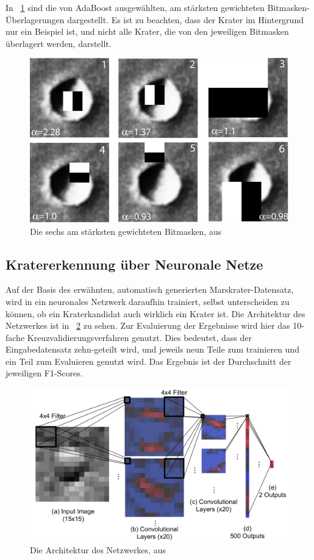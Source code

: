 In \figurename~\ref{fig:BDS12_02} sind die von AdaBoost ausgewählten, am stärksten gewichteten Bitmasken-Überlagerungen dargestellt. Es ist zu beachten, dass der Krater im Hintergrund nur ein Beispiel ist, und nicht alle Krater, die von den jeweiligen Bitmasken überlagert werden, darstellt.

\begin{figure}[h!]
	\centering
	\includegraphics[width=.5\textwidth,keepaspectratio]{images/BDS12_02.png}
	\caption{Die sechs am stärksten gewichteten Bitmasken, aus \cite{bandeira_12}}
	\label{fig:BDS12_02}
\end{figure}

\subsection{Kratererkennung über Neuronale Netze}
\label{ssec:crater_cnn}
Auf der Basis des erwähnten, automatisch generierten Marskrater-Datensatz, wird in \cite{cohen_16} ein neuronales Netzwerk daraufhin trainiert, selbst unterscheiden zu können, ob ein Kraterkandidat auch wirklich ein Krater ist. Die Architektur des Netzwerkes ist in \figurename~\ref{fig:CLLD16_01} zu sehen. Zur Evaluierung der Ergebnisse wird hier das 10-fache Kreuzvalidierungsverfahren genutzt. Dies bedeutet, dass der Eingabedatensatz zehn-geteilt wird, und jeweils neun Teile zum trainieren und ein Teil zum Evaluieren genutzt wird. Das Ergebnis ist der Durchschnitt der jeweiligen F1-Scores.

\begin{figure}[H]
	\centering
	\includegraphics[width=.5\textwidth,keepaspectratio]{images/CLLD16_01.png}
	\caption{Die Architektur des Netzwerkes, aus \cite{cohen_16}}
	\label{fig:CLLD16_01}
\end{figure}

